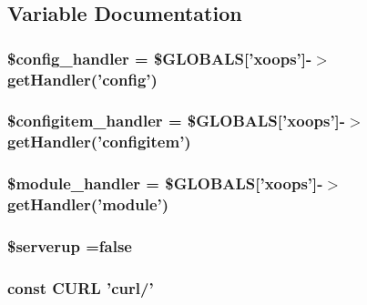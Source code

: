 \subsection{Variable Documentation}
\hypertarget{serverup_8php_a3906023967379550e215cdec8f56ae20}{
\subsubsection[{\$config\-\_\-handler}]{\setlength{\rightskip}{0pt plus 5cm}\$config\-\_\-handler = \$G\-L\-O\-B\-A\-L\-S\mbox{[}'xoops'\mbox{]}-\/$>$get\-Handler('config')}}\label{serverup_8php_a3906023967379550e215cdec8f56ae20}
\hypertarget{serverup_8php_a36e83a99f91f67ee7c165be5f9e3ca93}{
\subsubsection[{\$configitem\-\_\-handler}]{\setlength{\rightskip}{0pt plus 5cm}\$configitem\-\_\-handler = \$G\-L\-O\-B\-A\-L\-S\mbox{[}'xoops'\mbox{]}-\/$>$get\-Handler('configitem')}}\label{serverup_8php_a36e83a99f91f67ee7c165be5f9e3ca93}
\hypertarget{serverup_8php_afe9169534dbc3935c0823c21cfbf68bb}{
\subsubsection[{\$module\-\_\-handler}]{\setlength{\rightskip}{0pt plus 5cm}\$module\-\_\-handler = \$G\-L\-O\-B\-A\-L\-S\mbox{[}'xoops'\mbox{]}-\/$>$get\-Handler('module')}}\label{serverup_8php_afe9169534dbc3935c0823c21cfbf68bb}
\hypertarget{serverup_8php_a45a3b595731ee647ebed75a62561beeb}{
\subsubsection[{\$serverup}]{\setlength{\rightskip}{0pt plus 5cm}\$serverup =false}}\label{serverup_8php_a45a3b595731ee647ebed75a62561beeb}
\hypertarget{serverup_8php_ad0bd3808c083915191b2eb89901e57c0}{
\subsubsection[{C\-U\-R\-L}]{\setlength{\rightskip}{0pt plus 5cm}const C\-U\-R\-L 'curl/'}}\label{serverup_8php_ad0bd3808c083915191b2eb89901e57c0}
